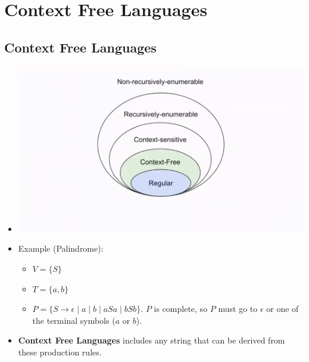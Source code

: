 \documentclass[12pt]{article}
\date{February 18, 2021}
\begin{document}
\maketitle

\section{Context Free Languages}

\subsection{Context Free Languages}
\begin{itemize}
    \item[] \includegraphics[width=\textwidth]{images/chomsky-hierarchy-context-free.png}
    \item Example (Palindrome):
    \begin{itemize}
        \item $V = \{ S \}$
        \item $T = \{ a, b \}$
        \item $P = \{ S \rightarrow \epsilon \mid a \mid b \mid aSa \mid bSb \}$. $P$ is complete, so $P$ must go to $\epsilon$ or one of the terminal symbols ($a$ or $b$).
    \end{itemize}
    \item \textbf{Context Free Languages} includes any string that can be derived from these production rules.
\end{itemize}
\end{document}
